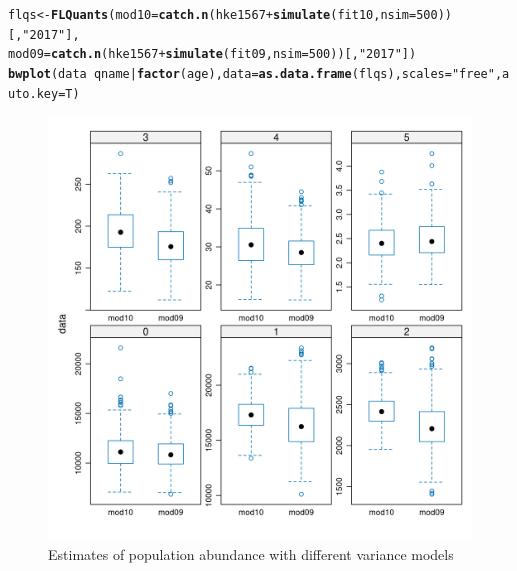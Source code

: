 \documentclass[a4paper,english,11pt]{article}\usepackage[]{graphicx}\usepackage[]{xcolor}
\makeatletter
\newcommand{\hlnum}[1]{\textcolor[rgb]{0.686,0.059,0.569}{#1}}%
\newcommand{\hlsng}[1]{\textcolor[rgb]{0.192,0.494,0.8}{#1}}%
\newcommand{\hlopt}[1]{\textcolor[rgb]{0,0,0}{#1}}%
\newcommand{\hldef}[1]{\textcolor[rgb]{0.345,0.345,0.345}{#1}}%
\newcommand{\hlkwb}[1]{\textcolor[rgb]{0.69,0.353,0.396}{#1}}%
\newcommand{\hlkwc}[1]{\textcolor[rgb]{0.333,0.667,0.333}{#1}}%
\newcommand{\hlkwd}[1]{\textcolor[rgb]{0.737,0.353,0.396}{\textbf{#1}}}%
\newenvironment{kframe}{%
 \def\at@end@of@kframe{}%
 \ifinner\ifhmode%
  \def\at@end@of@kframe{\end{minipage}}%
  \begin{minipage}{\columnwidth}%
 \fi\fi%
 \def\FrameCommand##1{\hskip\@totalleftmargin \hskip-\fboxsep
 \colorbox{shadecolor}{##1}\hskip-\fboxsep
     \hskip-\linewidth \hskip-\@totalleftmargin \hskip\columnwidth}%
 \MakeFramed {\advance\hsize-\width
   \@totalleftmargin\z@ \linewidth\hsize
   \@setminipage}}%
 {\par\unskip\endMakeFramed%
 \at@end@of@kframe}
\newenvironment{knitrout}{}{} %
\makeatother
\begin{document}
\begin{knitrout}
\color{fgcolor}\begin{kframe}
\begin{alltt}
\hldef{flqs} \hlkwb{<-} \hlkwd{FLQuants}\hldef{(}\hlkwc{mod10} \hldef{=} \hlkwd{catch.n}\hldef{(hke1567} \hlopt{+} \hlkwd{simulate}\hldef{(fit10,} \hlkwc{nsim} \hldef{=} \hlnum{500}\hldef{))[,} \hlsng{"2017"}\hldef{],}
    \hlkwc{mod09} \hldef{=} \hlkwd{catch.n}\hldef{(hke1567} \hlopt{+} \hlkwd{simulate}\hldef{(fit09,} \hlkwc{nsim} \hldef{=} \hlnum{500}\hldef{))[,} \hlsng{"2017"}\hldef{])}
\hlkwd{bwplot}\hldef{(data} \hlopt{~} \hldef{qname} \hlopt{|} \hlkwd{factor}\hldef{(age),} \hlkwc{data} \hldef{=} \hlkwd{as.data.frame}\hldef{(flqs),} \hlkwc{scales} \hldef{=} \hlsng{"free"}\hldef{,} \hlkwc{auto.key} \hldef{= T)}
\end{alltt}
\end{kframe}\begin{figure}[H]

{\centering \includegraphics[width=.9\linewidth]{figure/vage-1} 

}

\caption[Estimates of population abundance with different variance models]{Estimates of population abundance with different variance models}\label{fig:vage}
\end{figure}

\end{knitrout}
\end{document}
